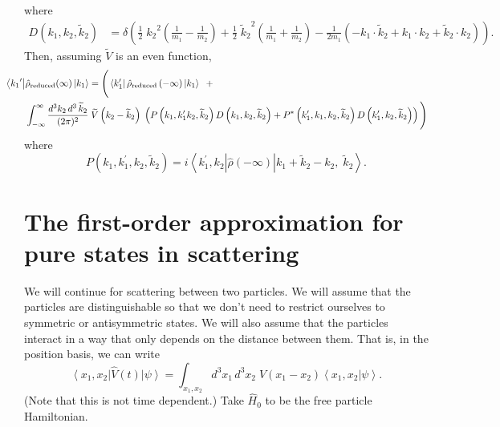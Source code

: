 \documentclass[11pt]{article}
\newcommand{\bra}[1]{\left\langle#1\right|}
\newcommand{\ket}[1]{\left|#1\right\rangle}
\newcommand{\braket}[2]{\left\langle#1|#2\right\rangle}
\newcommand{\op}[1]{\hat{#1}}
\theoremstyle{theorem}
\theoremstyle{remark}
\theoremstyle{step}
\theoremstyle{gap}
\begin{document}
where
\begin{align*}
D(k_1, k_2, \widetilde{k}_2) &= \delta\left({\textstyle \frac{1}{2}\;{{k}_2}^2\left(\frac{1}{m_1}-\frac{1}{m_2}\right)+ \frac{1}{2}\;{\widetilde{k}_2}^2\left(\frac{1}{m_1}+\frac{1}{m_2}\right) - \frac{1}{2m_1}\left(-k_1\cdot \widetilde{k}_2 + k_1 \cdot k_2 + \widetilde{k}_2 \cdot k_2\right)}\right).
\end{align*}
Then, assuming \(\widetilde{V}\) is an even function,
\begin{align}\label{eq.reddensevolution}
\hspace{-4em}\bra{{k_1}^\prime}&\op{\rho}_\text{reduced}(\infty)\ket{k_1}
= {\Bigg (}
\bra{k_1^\prime}\op{\rho}_\text{reduced}\left(-\infty\right)\ket{k_1}\;\;+
 \\&\nonumber \int_{-\infty}^\infty \frac{d^3k_2 \,d^3\,\widetilde{k}_2}{(2\pi)^2}\;\widetilde{V}\left(k_2 - 
\widetilde{k}_2\right)\;\left(P\left(k_1,k_1^\prime k_2, \widetilde{k}_2\right)D\left(k_1, k_2, \widetilde{k}_2\right) + P^*\left(k_1^\prime,k_1, k_2, \widetilde{k}_2\right)D\left(k_1^\prime, k_2, \widetilde{k}_2\right)\right){\Bigg )}
\end{align}
where
\[
P(k_1, k_1^\prime, k_2, \widetilde{k}_2) = i\bra{k_1^\prime, k_2} \op{\rho}\left(-\infty\right) \ket{k_1 + \widetilde{k}_2 - k_2,\; \widetilde{k}_2}.
\]

\appendix

\section{The first-order approximation for pure states in scattering}

We will continue for scattering between two particles. We will assume that the particles are distinguishable so that we don't need to restrict ourselves to symmetric or antisymmetric states. We will also assume that the particles interact in a way that only depends on the distance between them. That is, in the position basis, we can write
\begin{equation}\label{eq.Vposbasis}
\bra{x_1, x_2}\op{V}(t)\ket{\psi} = \int_{x_1,x_2} {d^3 x_1 \,d^3x_2}\; V(x_1 - x_2) \braket{x_1, x_2}{\psi}.
\end{equation}
(Note that this is not time dependent.) Take \(\op{H}_0\) to be the free particle Hamiltonian.
\end{document}
